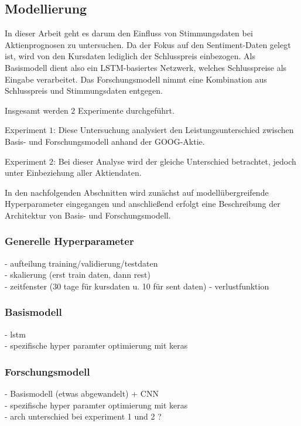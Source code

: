 \newpage
\subsection{Modellierung}\label{sec:modellierung}

In dieser Arbeit geht es darum den Einfluss von Stimmungsdaten bei Aktienprognosen zu untersuchen. Da der Fokus auf den Sentiment-Daten gelegt ist, wird von den Kursdaten lediglich der Schlusspreis einbezogen. Als Basismodell dient also ein LSTM-basiertes Netzwerk, welches Schlusspreise als Eingabe verarbeitet. Das Forschungsmodell nimmt eine Kombination aus Schlusspreis und Stimmungsdaten entgegen.

Insgesamt werden $2$ Experimente durchgeführt. 

Experiment $1$:    
Diese Untersuchung analysiert den Leistungsunterschied zwischen Basis- und Forschungsmodell anhand der GOOG-Aktie.

Experiment $2$:   
Bei dieser Analyse wird der gleiche Unterschied betrachtet, jedoch unter Einbeziehung aller Aktiendaten.

In den nachfolgenden Abschnitten wird zunächst auf modellübergreifende Hyperparameter eingegangen und anschließend erfolgt eine Beschreibung der Architektur von Basis- und Forschungsmodell.

\subsubsection*{Generelle Hyperparameter}\label{sec:modellierung_generell_hp}

- aufteilung training/validierung/testdaten  \\
- skalierung (erst train daten, dann rest)  \\
- zeitfenster (30 tage für kursdaten u. 10 für sent daten)   
- verlustfunktion  


\subsubsection*{Basismodell}\label{sec:modellierung_basis_goog}

- lstm \\
- spezifische hyper paramter optimierung mit keras

\subsubsection*{Forschungsmodell}\label{sec:modellierung_forsch}

- Basismodell (etwas abgewandelt) + CNN \\
- spezifische hyper paramter optimierung mit keras \\
- arch unterschied bei experiment 1 und 2 ?








